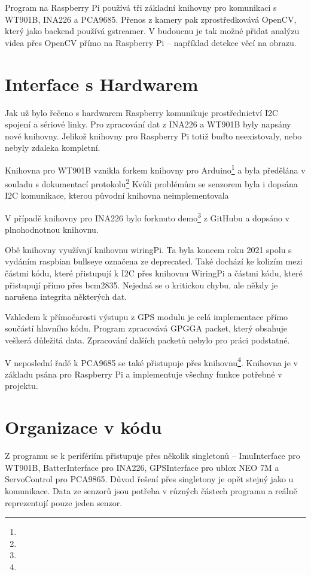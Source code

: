 \documentclass[a4paper,oneside,12pt]{report}
\begin{document}
Program na Raspberry Pi používá tři základní knihovny pro komunikaci s WT901B, INA226 a PCA9685.
Přenos z kamery pak zprostředkovává OpenCV, který jako backend používá gstreamer.
V budoucnu je tak možné přidat analýzu videa přes OpenCV přímo na Raspberry Pi -- například detekce věcí na obrazu.

\section{Interface s Hardwarem}

Jak už bylo řečeno s hardwarem Raspberry komunikuje prostřednictví I2C spojení a sériové linky.
Pro zpracování dat z INA226 a WT901B byly napsány nové knihovny.
Jelikož knihovny pro Raspberry Pi totiž buďto neexistovaly, nebo nebyly zdaleka kompletní.

Knihovna pro WT901B vznikla forkem knihovny pro Arduino\footnote{} a byla předělána v souladu s dokumentací protokolu\footnote{}
Kvůli problémům se senzorem byla i dopsána I2C komunikace, kterou původní knihovna neimplementovala

V případě knihovny pro INA226 bylo forknuto demo\footnote{} z GitHubu a dopsáno v plnohodnotnou knihovnu.


Obě knihovny využívají knihovnu wiringPi.
Ta byla koncem roku 2021 spolu s vydáním raspbian bullseye označena ze deprecated.
Také dochází ke kolizím mezi částmi kódu, které přistupují k I2C přes knihovnu WiringPi a částmi kódu, které přistupují přímo přes bcm2835.
Nejedná se o kritickou chybu, ale někdy je narušena integrita některých dat.

Vzhledem k přímočarosti výstupu z GPS modulu je celá implementace přímo součástí hlavního kódu.
Program zpracovává GPGGA packet, který obsahuje veškerá důležitá data.
Zpracování dalších packetů nebylo pro práci podstatné.

V neposlední řadě k PCA9685 se také přistupuje přes knihovnu\footnote{}.
Knihovna je v základu psána pro Raspberry Pi a implementuje všechny funkce potřebné v projektu.

\section{Organizace v kódu}

Z programu se k perifériím přistupuje přes několik singletonů -- ImuInterface pro WT901B, BatterInterface pro INA226, GPSInterface pro ublox NEO 7M a ServoControl pro PCA9865.
Důvod řešení přes singletony je opět stejný jako u komunikace.
Data ze senzorů jsou potřeba v různých částech programu a reálně reprezentují pouze jeden senzor.
\end{document}

